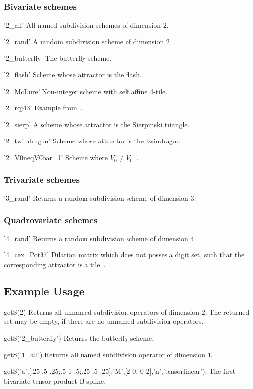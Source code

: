 \subsubsection{Bivariate schemes}
\begin{param}
\item['2\_all'] All named subdivision schemes of dimension $2$.
\item['2\_rand'] A random subdivision scheme of dimension $2$.
\item['2\_butterfly'] The butterfly scheme.
\item['2\_flash'] Scheme whose attractor is the flash.
\item['2\_McLure'] Non-integer scheme with self affine 4-tile.
\item['2\_rqj43'] Example from~\cite[Example 4.3]{CJR2002}.
\item['2\_sierp'] A scheme whose attractor is the Sierpinski triangle.
\item['2\_twindragon'] Scheme whose attractor is the twindragon.
\item['2\_V0neqV0bar\_1'] Scheme where $V_0\neq\tilde{V}_0$~\cite{CM18}.
\end{param}


\subsubsection{Trivariate schemes}
\begin{param}
\item['3\_rand'] Returns a random subdivision scheme of dimension $3$.
\end{param}

\subsubsection{Quadrovariate schemes}
\begin{param}
\item['4\_rand'] Returns a random subdivision scheme of dimension $4$.
\item['4\_cex\_Pot97'] Dilation matrix which does not posses a digit set, such that the corresponding attractor is a tile~\cite{Pot97}.
\end{param}


\subsection*{Example Usage}
\begin{param}
\item[getS(2)] Returns all unnamed subdivision operators of dimension $2$. The returned set may be empty, if there are no unnamed subdivision operators.
\item[getS('2\_butterfly')] Returns the butterfly scheme.
\item[getS('1\_all')] Returns all named subdivision operator of dimension 1.
\item[{getS('a',[.25 .5 .25;.5 1 .5;.25 .5 .25],'M',[2 0; 0 2],'n','tensorlinear');}] The first bivariate tensor-product B-spline.
\end{param}


